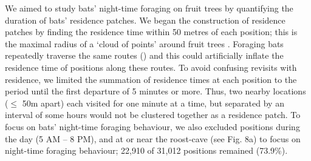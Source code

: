 \begin{refsection}[sorting=nyt]
    We aimed to study bats' night-time foraging on fruit trees by quantifying the duration of bats' residence patches.
    We began the construction of residence patches by finding the residence time within 50 metres of each position; this is the maximal radius of a `cloud of points' around fruit trees \citep{bracis2018}.
    Foraging bats repeatedly traverse the same routes (\citealt{toledo2020, tsoar2011, lourie2021}) and this could artificially inflate the residence time of positions along these routes.
    To avoid confusing revisits with residence, we limited the summation of residence times at each position to the period until the first departure of 5 minutes or more.
    Thus, two nearby locations ($\leq$ 50m apart) each visited for one minute at a time, but separated by an interval of some hours would not be clustered together as a residence patch. 
    To focus on bats' night-time foraging behaviour, we also excluded positions during the day (5 AM -- 8 PM), and at or near the roost-cave (see Fig. 8a) to focus on night-time foraging behaviour; 22,910 of 31,012 positions remained (73.9\%).
    

\end{refsection}
